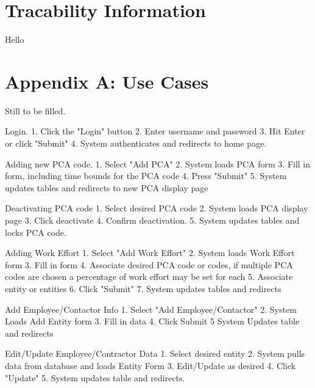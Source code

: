 \documentclass[letterpaper]{article}
\begin{document}
\section{Tracability Information}
Hello
\section{Appendix A: Use Cases} 
Still to be filled.

Login.
1. Click the "Login" button
2. Enter username and password
3. Hit Enter or click "Submit"
4. System authenticates and redirects to home page.

Adding new PCA code.
1. Select "Add PCA"
2. System loads PCA form
3. Fill in form, including time bounds for the PCA code
4. Press "Submit"
5. System updates tables and redirects to new PCA display page

Deactivating PCA code
1. Select desired PCA code
2. System loads PCA display page
3. Click deactivate
4. Confirm deactivation.
5. System updates tables and locks PCA code.

Adding Work Effort
1. Select "Add Work Effort"
2. System loads Work Effort form
3. Fill in form
4. Associate desired PCA code or codes, if multiple PCA codes are chosen a percentage of work effort may be set for each
5. Associate entity or entities
6. Click "Submit"
7. System updates tables and redirects

Add Employee/Contactor Info
1. Select "Add Employee/Contactor"
2. System Loads Add Entity form
3. Fill in data
4. Click Submit
5 System Updates table and redirects

Edit/Update Employee/Contractor Data
1. Select desired entity
2. System pulls data from database and loads Entity Form
3. Edit/Update as desired
4. Click "Update"
5. System updates table and redirects.
\end{document}
